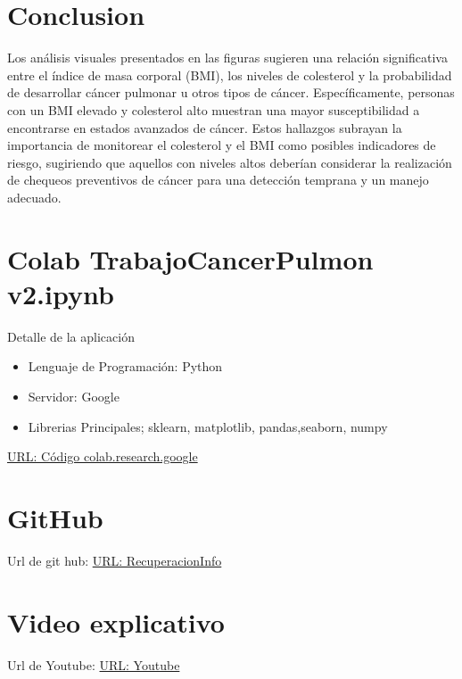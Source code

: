 \documentclass[10pt,journal,compsoc]{IEEEtran}
\begin{document}
\section{Conclusion}
Los análisis visuales presentados en las figuras sugieren una relación significativa entre el índice de masa corporal (BMI), los niveles de colesterol y la probabilidad de desarrollar cáncer pulmonar u otros tipos de cáncer. Específicamente, personas con un BMI elevado y colesterol alto muestran una mayor susceptibilidad a encontrarse en estados avanzados de cáncer. Estos hallazgos subrayan la importancia de monitorear el colesterol y el BMI como posibles indicadores de riesgo, sugiriendo que aquellos con niveles altos deberían considerar la realización de chequeos preventivos de cáncer para una detección temprana y un manejo adecuado.



\appendices
\section{Colab TrabajoCancerPulmon v2.ipynb}
Detalle de la aplicación
\begin{itemize}
  \item Lenguaje de Programación: Python
  \item Servidor: Google
  \item Librerias Principales; sklearn, matplotlib, pandas,seaborn, numpy
\end{itemize}
\href{https://colab.research.google.com/drive/1-HcDMOWJxGsakeZxqYCUc18EXPyz__4q?usp=sharing}{URL: Código  colab.research.google }

\section{GitHub}
Url de git hub: 
\href{https://github.com/hAriasm/RecuperacionInfo}{URL: RecuperacionInfo }
 
 \section{Video explicativo}
Url de Youtube:
\href{https://github.com/hAriasm/RecuperacionInfo}{URL: Youtube }
 
 
 
\ifCLASSOPTIONcaptionsoff
  \newpage
\fi
\end{document}
